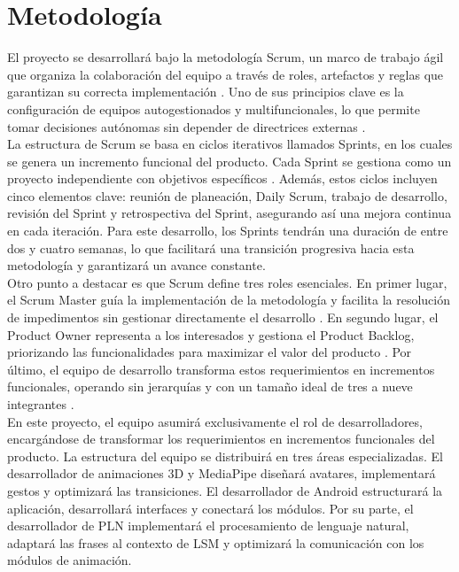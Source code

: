 \newpage
\section{Metodología}
El proyecto se desarrollará bajo la metodología Scrum, un marco de trabajo ágil que organiza la colaboración del equipo a través de roles, artefactos y reglas que garantizan su correcta implementación \cite{ref16}\cite{ref17}. Uno de sus principios clave es la configuración de equipos autogestionados y multifuncionales, lo que permite tomar decisiones autónomas sin depender de directrices externas \cite{ref17}.\\

La estructura de Scrum se basa en ciclos iterativos llamados Sprints, en los cuales se genera un incremento funcional del producto. Cada Sprint se gestiona como un proyecto independiente con objetivos específicos \cite{ref17}. Además, estos ciclos incluyen cinco elementos clave: reunión de planeación, Daily Scrum, trabajo de desarrollo, revisión del Sprint y retrospectiva del Sprint, asegurando así una mejora continua en cada iteración. Para este desarrollo, los Sprints tendrán una duración de entre dos y cuatro semanas, lo que facilitará una transición progresiva hacia esta metodología y garantizará un avance constante.\\

Otro punto a destacar es que Scrum define tres roles esenciales. En primer lugar, el Scrum Master guía la implementación de la metodología y facilita la resolución de impedimentos sin gestionar directamente el desarrollo \cite{ref18}. En segundo lugar, el Product Owner representa a los interesados y gestiona el Product Backlog, priorizando las funcionalidades para maximizar el valor del producto \cite{ref18}. Por último, el equipo de desarrollo transforma estos requerimientos en incrementos funcionales, operando sin jerarquías y con un tamaño ideal de tres a nueve integrantes \cite{ref18}.\\

En este proyecto, el equipo asumirá exclusivamente el rol de desarrolladores, encargándose de transformar los requerimientos en incrementos funcionales del producto. La estructura del equipo se distribuirá en tres áreas especializadas. El desarrollador de animaciones 3D y MediaPipe diseñará avatares, implementará gestos y optimizará las transiciones. El desarrollador de Android estructurará la aplicación, desarrollará interfaces y conectará los módulos. Por su parte, el desarrollador de PLN implementará el procesamiento de lenguaje natural, adaptará las frases al contexto de LSM y optimizará la comunicación con los módulos de animación.\\

